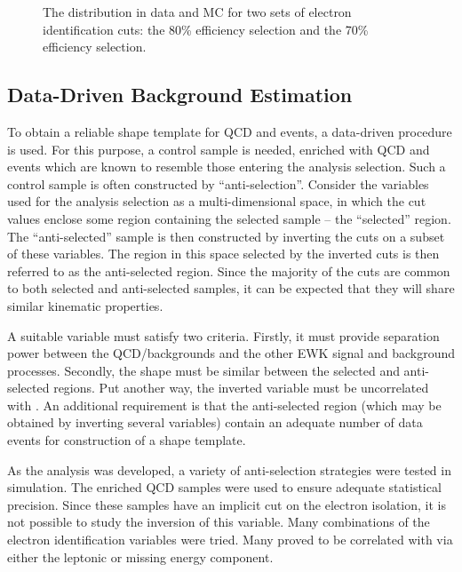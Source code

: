 \begin{figure}[h!]
\centering
{}\quad
{}
\caption[The \LP distribution in data and \ac{MC} for two sets of electron
identification cuts]{The \LP distribution in data and \ac{MC} for two sets of
  electron identification cuts:  the 80\% efficiency
  selection and  the 70\% efficiency selection.}
\label{fig:wpol_wp80_vs_wp70}
\end{figure}

\subsection{Data-Driven Background Estimation}
\label{sec:wpol_data_driven_bg}
To obtain a reliable shape template for \ac{QCD} and \gammajets events, a
data-driven procedure is used. For this purpose, a control sample is needed,
enriched with \ac{QCD} and \gammajets events which are known to resemble those
entering the analysis selection. Such a control sample is often constructed by
``anti-selection''. Consider the variables used for the analysis selection as a
multi-dimensional space, in which the cut values enclose some region containing
the selected sample -- the ``selected'' region. The ``anti-selected'' sample is
then constructed by inverting the cuts on a subset of these variables. The
region in this space selected by the inverted cuts is then referred to as the
anti-selected region. Since the majority of the cuts are common to both selected
and anti-selected samples, it can be expected that they will share similar
kinematic properties.

A suitable variable must satisfy two criteria. Firstly, it must provide
separation power between the \ac{QCD}/\gammajets backgrounds and the other
\ac{EWK} signal and background processes. Secondly, the \LP shape must be
similar between the selected and anti-selected regions. Put another way, the
inverted variable must be uncorrelated with \LP. An additional requirement is
that the anti-selected region (which may be obtained by inverting several
variables) contain an adequate number of data events for construction of a shape
template.

As the analysis was developed, a variety of anti-selection strategies were
tested in simulation. The enriched \ac{QCD} samples were used to ensure adequate
statistical precision. Since these samples have an implicit cut on the electron
isolation, it is not possible to study the inversion of this variable. Many
combinations of the electron identification variables were tried. Many proved to
be correlated with \LP via either the leptonic or missing energy component.

